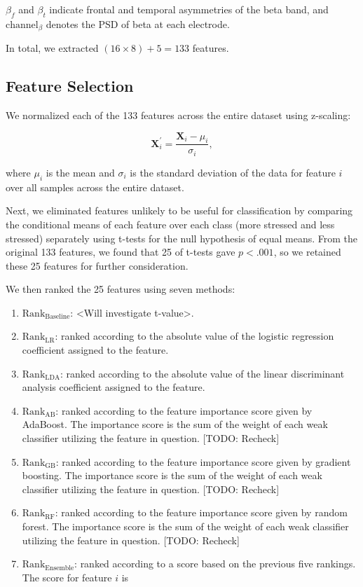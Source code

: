 \documentclass[pdflatex,sn-mathphys]{sn-jnl}%
\theoremstyle{thmstyleone}%
\theoremstyle{thmstyletwo}%
\theoremstyle{thmstylethree}%
\begin{document}
$\beta_{f}$ and $\beta_{t}$ indicate frontal and temporal asymmetries of the beta band, and $\text{channel}_\beta$ denotes the PSD of beta at each electrode.

In total, we extracted $(16 \times 8) + 5 = 133$ features.

\subsection{Feature Selection}\label{sec:feature_selection}

We normalized each of the 133 features across the entire dataset using z-scaling:

\begin{equation} \label{eq:normalized}
   \mathbf{X}^{\prime}_i = \frac{\mathbf{X}_i - \mu_i}{\sigma_i},
\end{equation}

where $\mu_i$ is the mean and $\sigma_i$ is the standard deviation of the data for feature $i$ over all samples across the entire dataset.

Next, we eliminated features unlikely to be useful for classification by comparing the conditional means of each feature over each class (more stressed and less stressed) separately using t-tests for the null hypothesis of equal means. From the original 133 features, we found that 25 of t-tests gave $p < .001$, so we retained these 25 features for further consideration.

We then ranked the 25 features using seven methods:

\begin{enumerate}
    \item $\text{Rank}_{\text{Baseline}}$: <Will investigate t-value>.
    \item $\text{Rank}_{\text{LR}}$: ranked according to the absolute value of the logistic regression coefficient assigned to the feature.
    \item $\text{Rank}_{\text{LDA}}$: ranked according to the absolute value of the linear discriminant analysis coefficient assigned to the feature.
    \item $\text{Rank}_{\text{AB}}$: ranked according to the feature importance score given by AdaBoost. The importance score is the sum of the weight of each weak classifier utilizing the feature in question. [TODO: Recheck]
    \item $\text{Rank}_{\text{GB}}$: ranked according to the feature importance score given by gradient boosting. The importance score is the sum of the weight of each weak classifier utilizing the feature in question. [TODO: Recheck]
    \item $\text{Rank}_{\text{RF}}$: ranked according to the feature importance score given by random forest. The importance score is the sum of the weight of each weak classifier utilizing the feature in question. [TODO: Recheck]
    \item $\text{Rank}_{\text{Ensemble}}$: ranked according to a score based on the previous five rankings. The score for feature $i$ is
\end{enumerate}
\end{document}
